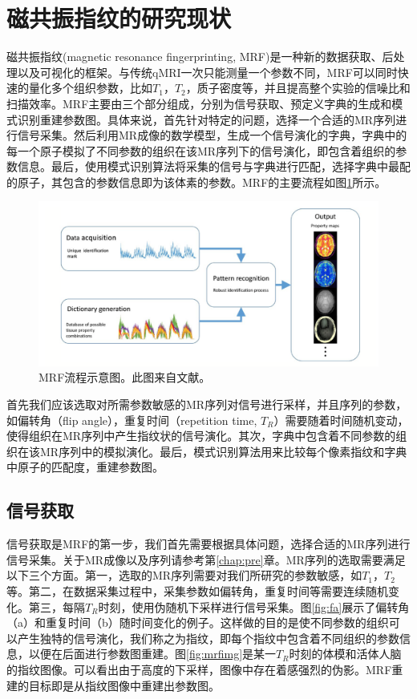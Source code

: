 \section{磁共振指纹的研究现状}
\label{sec:mrf}
磁共振指纹(magnetic resonance fingerprinting, MRF)是一种新的数据获取、后处理以及可视化的框架。与传统qMRI一次只能测量一个参数不同，MRF可以同时快速的量化多个组织参数，比如$T_1$，$T_2$，质子密度等，并且提高整个实验的信噪比和扫描效率。MRF主要由三个部分组成，分别为信号获取、预定义字典的生成和模式识别重建参数图。具体来说，首先针对特定的问题，选择一个合适的MR序列进行信号采集。然后利用MR成像的数学模型，生成一个信号演化的字典，字典中的每一个原子模拟了不同参数的组织在该MR序列下的信号演化，即包含着组织的参数信息。最后，使用模式识别算法将采集的信号与字典进行匹配，选择字典中最配的原子，其包含的参数信息即为该体素的参数。MRF的主要流程如图\ref{fig:mrf}所示。
\begin{figure}[htbp]
\centerline{\includegraphics[width=1\textwidth]{img/intro/mrf.png}}
\caption{
MRF流程示意图。此图来自文献\cite{mrfreview}。
}
\label{fig:mrf}
\end{figure}

首先我们应该选取对所需参数敏感的MR序列对信号进行采样，并且序列的参数，如偏转角（flip angle），重复时间（repetition time, $T_R$）需要随着时间随机变动，使得组织在MR序列中产生指纹状的信号演化。其次，字典中包含着不同参数的组织在该MR序列中的模拟演化。最后，模式识别算法用来比较每个像素指纹和字典中原子的匹配度，重建参数图。

\subsection{信号获取}
信号获取是MRF的第一步，我们首先需要根据具体问题，选择合适的MR序列进行信号采集。关于MR成像以及序列请参考第\ref{chap:pre}章。MR序列的选取需要满足以下三个方面。第一，选取的MR序列需要对我们所研究的参数敏感，如$T_1$，$T_2$等。第二，在数据采集过程中，采集参数如偏转角，重复时间等需要连续随机变化。第三，每隔$T_R$时刻，使用伪随机下采样进行信号采集。图\ref{fig:fa}展示了偏转角（a）和重复时间（b）随时间变化的例子。这样做的目的是使不同参数的组织可以产生独特的信号演化，我们称之为指纹，即每个指纹中包含着不同组织的参数信息，以便在后面进行参数图重建。图\ref{fig:mrfimg}是某一$T_R$时刻的体模和活体人脑的指纹图像。可以看出由于高度的下采样，图像中存在着感强烈的伪影。MRF重建的目标即是从指纹图像中重建出参数图。

